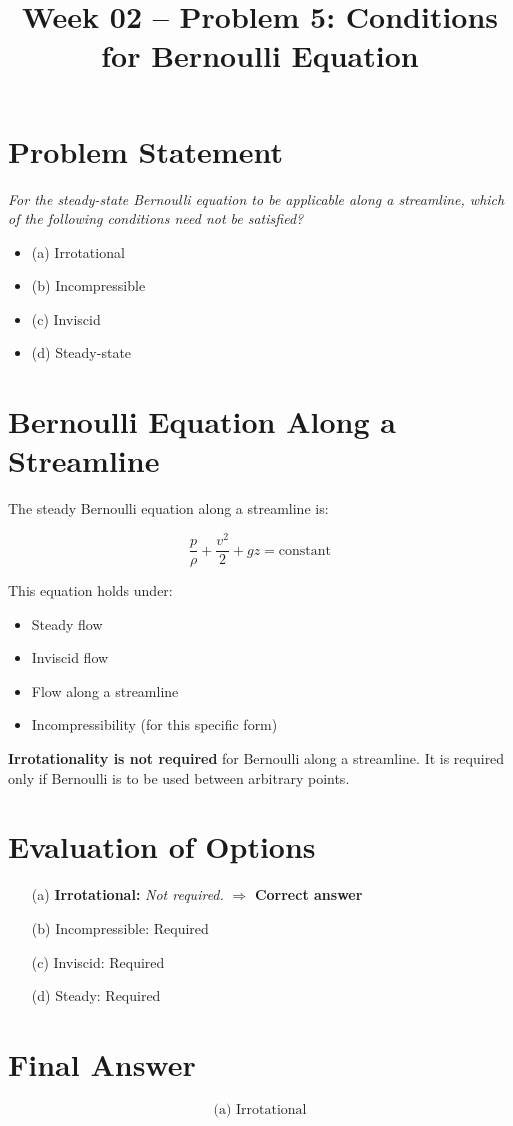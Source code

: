 \documentclass[12pt]{article}
\title{Week 02 -- Problem 5: Conditions for Bernoulli Equation}
\date{}
\begin{document}
\maketitle

\section*{Problem Statement}

\textit{For the steady-state Bernoulli equation to be applicable along a streamline, which of the following conditions need not be satisfied?}

\begin{itemize}
\item (a) Irrotational
\item (b) Incompressible
\item (c) Inviscid
\item (d) Steady-state
\end{itemize}

\section*{Bernoulli Equation Along a Streamline}

The steady Bernoulli equation along a streamline is:

\[
\frac{p}{\rho} + \frac{v^2}{2} + gz = \text{constant}
\]

This equation holds under:

\begin{itemize}
\item Steady flow
\item Inviscid flow
\item Flow along a streamline
\item Incompressibility (for this specific form)
\end{itemize}

\textbf{Irrotationality is not required} for Bernoulli along a streamline. It is required only if Bernoulli is to be used between arbitrary points.

\section*{Evaluation of Options}

\begin{itemize}
\item[(a)] \textbf{Irrotational:} \textit{Not required.} $\Rightarrow$ \textbf{Correct answer}
\item[(b)] Incompressible: Required
\item[(c)] Inviscid: Required
\item[(d)] Steady: Required
\end{itemize}

\section*{Final Answer}

\[
\boxed{\text{(a) Irrotational}}
\]
\end{document}
